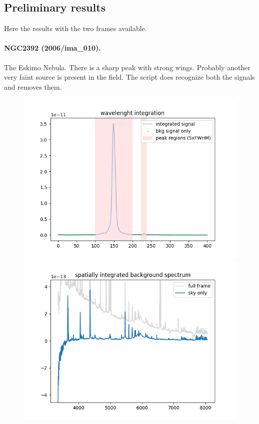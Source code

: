 \documentclass{article}
\begin{document}
\subsection{Preliminary results}
Here the results with the two frames available.

\paragraph{NGC2392 (2006/ima\_010).} The Eskimo Nebula. There is a sharp peak with strong wings. Probably another very faint source is present in the field. The script does recognize both the signals and removes them.

\begin{figure}[h!]
	\begin{minipage}{.49\textwidth}
		\centering
		\includegraphics[width=\textwidth]{10_1}
	\end{minipage}
\hfill
	\begin{minipage}{.49\textwidth}
	\centering
	\includegraphics[width=\textwidth]{10_2}
\end{minipage}
\end{figure}
\end{document}
